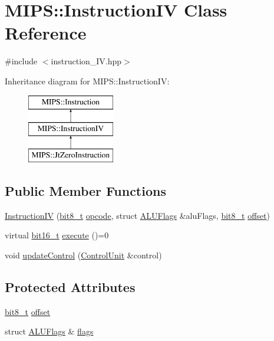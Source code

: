\hypertarget{classMIPS_1_1InstructionIV}{}\section{M\+I\+PS\+:\+:Instruction\+IV Class Reference}
\label{classMIPS_1_1InstructionIV}


{\ttfamily \#include $<$instruction\+\_\+\+I\+V.\+hpp$>$}

Inheritance diagram for M\+I\+PS\+:\+:Instruction\+IV\+:\begin{figure}[H]
\begin{center}
\leavevmode
\includegraphics[height=3.000000cm]{classMIPS_1_1InstructionIV}
\end{center}
\end{figure}
\subsection*{Public Member Functions}
\begin{DoxyCompactItemize}
\item 
\hyperlink{classMIPS_1_1InstructionIV_a9219778a142dd2f6114ecf39bf9d24f3}{Instruction\+IV} (\hyperlink{core_8hpp_a6074bae122ae7b527864eec42c728c3c}{bit8\+\_\+t} \hyperlink{classMIPS_1_1Instruction_a45cc6808b5dde8a5d41067d148b55476}{opcode}, struct \hyperlink{structMIPS_1_1ALUFlags}{A\+L\+U\+Flags} \&alu\+Flags, \hyperlink{core_8hpp_a6074bae122ae7b527864eec42c728c3c}{bit8\+\_\+t} \hyperlink{classMIPS_1_1InstructionIV_abcb91e65c800a41bf9c46b5770120b36}{offset})
\item 
virtual \hyperlink{core_8hpp_adc265a970bc35995b5879784bbb3f1b7}{bit16\+\_\+t} \hyperlink{classMIPS_1_1InstructionIV_ae9eeb2c1aa5392cc3e2d9f2d816b799c}{execute} ()=0
\item 
void \hyperlink{classMIPS_1_1InstructionIV_af851bc54b16ff1b29537237a0b5882c3}{update\+Control} (\hyperlink{classMIPS_1_1ControlUnit}{Control\+Unit} \&control)
\end{DoxyCompactItemize}
\subsection*{Protected Attributes}
\begin{DoxyCompactItemize}
\item 
\hyperlink{core_8hpp_a6074bae122ae7b527864eec42c728c3c}{bit8\+\_\+t} \hyperlink{classMIPS_1_1InstructionIV_abcb91e65c800a41bf9c46b5770120b36}{offset}
\item 
struct \hyperlink{structMIPS_1_1ALUFlags}{A\+L\+U\+Flags} \& \hyperlink{classMIPS_1_1InstructionIV_a7858449be2ee97f8ed852f7b8e8b4879}{flags}
\end{DoxyCompactItemize}


